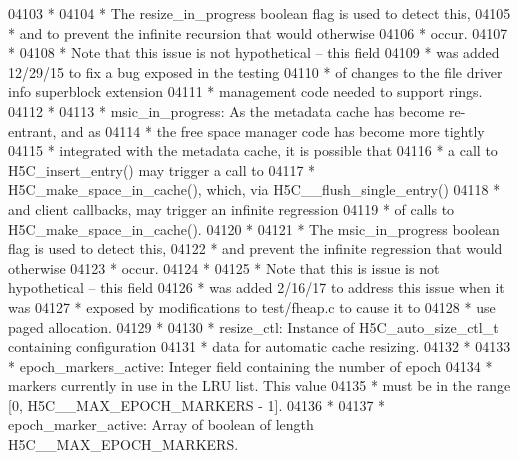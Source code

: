 \begin{DoxyCode}
04103 \textcolor{comment}{ *}
04104 \textcolor{comment}{ *      The resize\_in\_progress boolean flag is used to detect this,}
04105 \textcolor{comment}{ *      and to prevent the infinite recursion that would otherwise}
04106 \textcolor{comment}{ *      occur.}
04107 \textcolor{comment}{ *}
04108 \textcolor{comment}{ *      Note that this issue is not hypothetical -- this field }
04109 \textcolor{comment}{ *      was added 12/29/15 to fix a bug exposed in the testing }
04110 \textcolor{comment}{ *      of changes to the file driver info superblock extension}
04111 \textcolor{comment}{ *      management code needed to support rings.}
04112 \textcolor{comment}{ *}
04113 \textcolor{comment}{ * msic\_in\_progress: As the metadata cache has become re-entrant, and as}
04114 \textcolor{comment}{ *              the free space manager code has become more tightly }
04115 \textcolor{comment}{ *              integrated with the metadata cache, it is possible that }
04116 \textcolor{comment}{ *              a call to H5C\_insert\_entry() may trigger a call to }
04117 \textcolor{comment}{ *              H5C\_make\_space\_in\_cache(), which, via H5C\_\_flush\_single\_entry()}
04118 \textcolor{comment}{ *              and client callbacks, may trigger an infinite regression}
04119 \textcolor{comment}{ *              of calls to H5C\_make\_space\_in\_cache().}
04120 \textcolor{comment}{ *}
04121 \textcolor{comment}{ *              The msic\_in\_progress boolean flag is used to detect this,}
04122 \textcolor{comment}{ *              and prevent the infinite regression that would otherwise}
04123 \textcolor{comment}{ *              occur.}
04124 \textcolor{comment}{ *}
04125 \textcolor{comment}{ *              Note that this is issue is not hypothetical -- this field }
04126 \textcolor{comment}{ *              was added 2/16/17 to address this issue when it was }
04127 \textcolor{comment}{ *              exposed by modifications to test/fheap.c to cause it to }
04128 \textcolor{comment}{ *              use paged allocation.}
04129 \textcolor{comment}{ *}
04130 \textcolor{comment}{ * resize\_ctl:  Instance of H5C\_auto\_size\_ctl\_t containing configuration}
04131 \textcolor{comment}{ *      data for automatic cache resizing.}
04132 \textcolor{comment}{ *}
04133 \textcolor{comment}{ * epoch\_markers\_active:  Integer field containing the number of epoch}
04134 \textcolor{comment}{ *      markers currently in use in the LRU list.  This value}
04135 \textcolor{comment}{ *      must be in the range [0, H5C\_\_MAX\_EPOCH\_MARKERS - 1].}
04136 \textcolor{comment}{ *}
04137 \textcolor{comment}{ * epoch\_marker\_active:  Array of boolean of length H5C\_\_MAX\_EPOCH\_MARKERS.}

\end{DoxyCode}
